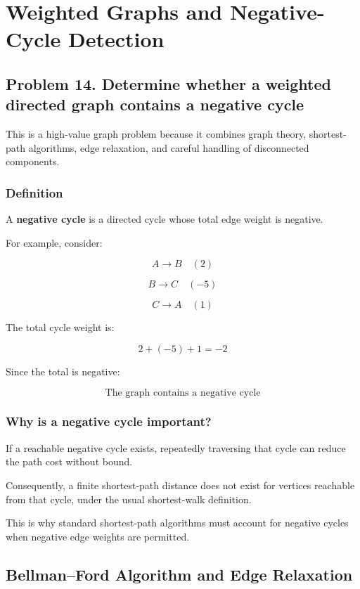 \section{Weighted Graphs and Negative-Cycle Detection}


\subsection{Problem 14. Determine whether a weighted directed graph contains a negative cycle}

This is a high-value graph problem because it combines graph theory, shortest-path algorithms, edge relaxation, and careful handling of disconnected components.

\subsubsection{Definition}

A \textbf{negative cycle} is a directed cycle whose total edge weight is negative.

For example, consider:


\[
A\rightarrow B \quad (2)
\]



\[
B\rightarrow C \quad (-5)
\]



\[
C\rightarrow A \quad (1)
\]


The total cycle weight is:


\[
2+(-5)+1=-2
\]


Since the total is negative:


\[
\boxed{\text{The graph contains a negative cycle}}
\]


\subsubsection{Why is a negative cycle important?}

If a reachable negative cycle exists, repeatedly traversing that cycle can reduce the path cost without bound.

Consequently, a finite shortest-path distance does not exist for vertices reachable from that cycle, under the usual shortest-walk definition.

This is why standard shortest-path algorithms must account for negative cycles when negative edge weights are permitted.

\subsection{Bellman--Ford Algorithm and Edge Relaxation}

